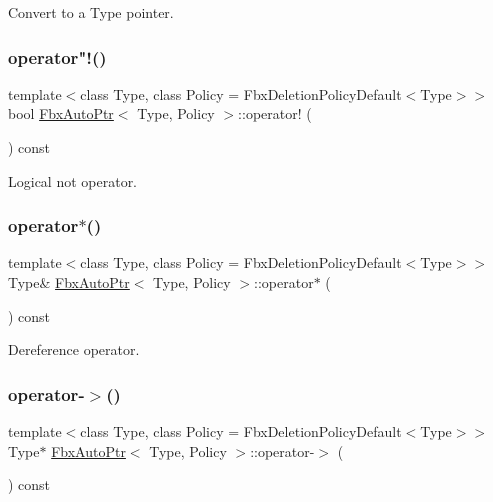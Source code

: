 Convert to a Type pointer. 

\mbox{\label{class_fbx_auto_ptr_afc9bb02ba900f9920772416291690f45}} 
\subsubsection{\texorpdfstring{operator"!()}{operator!()}}
{\footnotesize\ttfamily template$<$class Type, class Policy = Fbx\+Deletion\+Policy\+Default$<$\+Type$>$$>$ \\
bool \hyperlink{class_fbx_auto_ptr}{Fbx\+Auto\+Ptr}$<$ Type, Policy $>$\+::operator! (\begin{DoxyParamCaption}{ }\end{DoxyParamCaption}) const}



Logical not operator. 

\mbox{\label{class_fbx_auto_ptr_acb65f0b9499fede18cb2749fa42f40a9}} 
\subsubsection{\texorpdfstring{operator$\ast$()}{operator*()}}
{\footnotesize\ttfamily template$<$class Type, class Policy = Fbx\+Deletion\+Policy\+Default$<$\+Type$>$$>$ \\
Type\& \hyperlink{class_fbx_auto_ptr}{Fbx\+Auto\+Ptr}$<$ Type, Policy $>$\+::operator$\ast$ (\begin{DoxyParamCaption}{ }\end{DoxyParamCaption}) const}



Dereference operator. 

\mbox{\label{class_fbx_auto_ptr_adfc79ea055e3de00252fb707ff5cfe31}} 
\subsubsection{\texorpdfstring{operator-\/$>$()}{operator->()}}
{\footnotesize\ttfamily template$<$class Type, class Policy = Fbx\+Deletion\+Policy\+Default$<$\+Type$>$$>$ \\
Type$\ast$ \hyperlink{class_fbx_auto_ptr}{Fbx\+Auto\+Ptr}$<$ Type, Policy $>$\+::operator-\/$>$ (\begin{DoxyParamCaption}{ }\end{DoxyParamCaption}) const}



